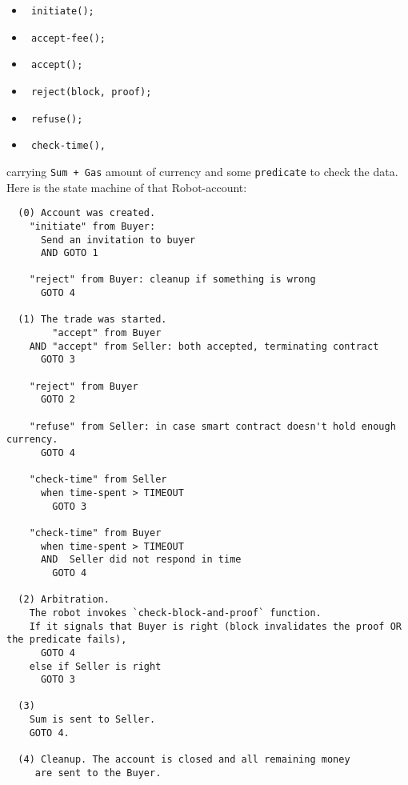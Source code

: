 \begin{itemize}
  \item \begin{verbatim} initiate(); \end{verbatim}
  \item \begin{verbatim} accept-fee(); \end{verbatim}
  \item \begin{verbatim} accept(); \end{verbatim}
  \item \begin{verbatim} reject(block, proof); \end{verbatim}
  \item \begin{verbatim} refuse(); \end{verbatim}
  \item \begin{verbatim} check-time(), \end{verbatim}
\end{itemize}
carrying \verb|Sum + Gas| amount of currency and some \verb|predicate| to check the data.
\newline
\newline
Here is the state machine of that Robot-account:

\begin{verbatim}
  (0) Account was created.
    "initiate" from Buyer:
      Send an invitation to buyer
      AND GOTO 1

    "reject" from Buyer: cleanup if something is wrong
      GOTO 4

  (1) The trade was started.
        "accept" from Buyer
    AND "accept" from Seller: both accepted, terminating contract
      GOTO 3

    "reject" from Buyer
      GOTO 2

    "refuse" from Seller: in case smart contract doesn't hold enough currency.
      GOTO 4

    "check-time" from Seller
      when time-spent > TIMEOUT
        GOTO 3

    "check-time" from Buyer
      when time-spent > TIMEOUT
      AND  Seller did not respond in time
        GOTO 4

  (2) Arbitration.
    The robot invokes `check-block-and-proof` function.
    If it signals that Buyer is right (block invalidates the proof OR the predicate fails),
      GOTO 4
    else if Seller is right
      GOTO 3

  (3)
    Sum is sent to Seller.
    GOTO 4.

  (4) Cleanup. The account is closed and all remaining money
     are sent to the Buyer.

\end{verbatim}


